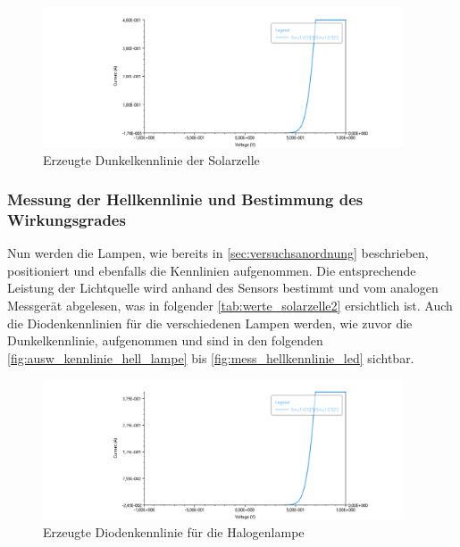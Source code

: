 \documentclass[12pt,english,ngerman]{scrartcl}
\begin{document}
\begin{figure}[H]
	\centering
	\includegraphics[width=0.95\textwidth]{figures/dunekl.png}
	\caption{Erzeugte Dunkelkennlinie der Solarzelle}\label{fig:mess_dunkelkennlinie}
\end{figure}

\subsubsection{Messung der Hellkennlinie und Bestimmung des Wirkungsgrades}

Nun werden die Lampen, wie bereits in \autoref{sec:versuchsanordnung}
beschrieben, positioniert und ebenfalls die Kennlinien aufgenommen. Die
entsprechende Leistung der Lichtquelle wird anhand des Sensors bestimmt und vom
analogen Messgerät abgelesen, was in folgender \autoref{tab:werte_solarzelle2}
ersichtlich ist. Auch die Diodenkennlinien für die verschiedenen Lampen werden,
wie zuvor die Dunkelkennlinie, aufgenommen und sind in den folgenden 
\autoref{fig:ausw_kennlinie_hell_lampe} bis \autoref{fig:mess_hellkennlinie_led}
sichtbar.


\begin{figure}[H]
	\centering
	\includegraphics[width=0.95\textwidth]{figures/helllampe.png}
	\caption{Erzeugte Diodenkennlinie für die Halogenlampe}\label{fig:mess_hellkennlinie_lampe}
\end{figure}
\end{document}

